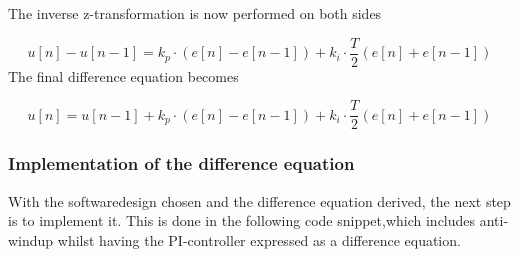 \documentclass[../../../main]{subfiles}
\begin{document}
The inverse z-transformation is now performed on both sides

$$
  u[n]-u[n-1] =  k_p \cdot (e[n] - e[n-1])  + k_i \cdot \frac{T}{2}(e[n] + e[n-1])
$$
The final difference equation becomes

$$
  u[n] = u[n-1] + k_p \cdot (e[n] - e[n-1])  + k_i \cdot \frac{T}{2}(e[n] + e[n-1])
$$



\subsubsection{Implementation of the difference equation}

With the softwaredesign chosen and the difference equation derived, the next step is to implement it.
This is done in the following code snippet,which includes anti-windup whilst having the PI-controller expressed as a difference equation.


\end{document}
